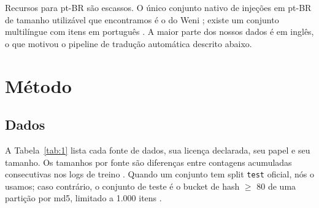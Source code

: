 \documentclass[11pt]{article}
\newcommand{\code}[1]{\texttt{#1}}
\begin{document}
Recursos para pt-BR são escassos. O único conjunto nativo de injeções em pt-BR de tamanho utilizável que encontramos é o do Weni \citep{weni2024promptinjections}; existe um conjunto multilíngue com itens em português \citep{rikka2025multilingual}. A maior parte dos nossos dados é em inglês, o que motivou o pipeline de tradução automática descrito abaixo.

\section{Método}\label{sec:3}

\subsection{Dados}\label{sec:3.1}

A Tabela~\ref{tab:1} lista cada fonte de dados, sua licença declarada, seu papel e seu tamanho. Os tamanhos por fonte são diferenças entre contagens acumuladas consecutivas nos logs de treino%
. Quando um conjunto tem split \code{test} oficial, nós o usamos; caso contrário, o conjunto de teste é o bucket de hash \ensuremath{\geq} 80 de uma partição por md5, limitado a 1.000 itens%
.
\end{document}
